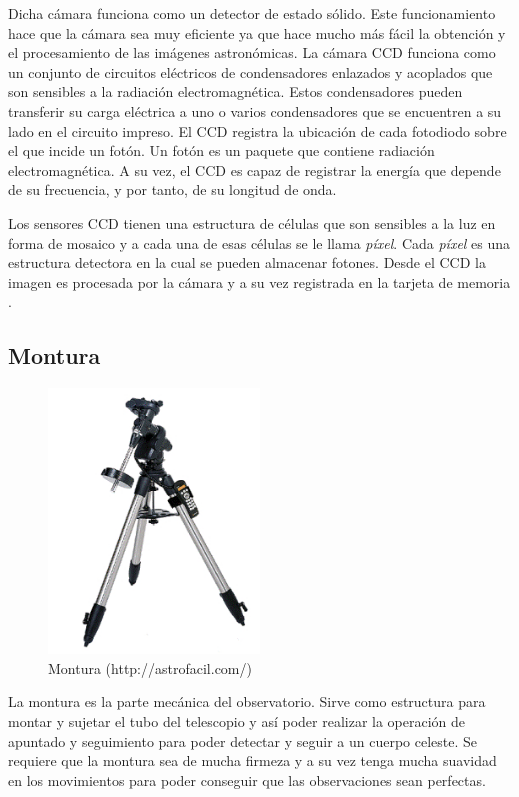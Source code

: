 Dicha cámara funciona como un detector de estado sólido. Este funcionamiento hace que la cámara sea muy eficiente ya que hace mucho más fácil la obtención y el procesamiento de las imágenes astronómicas.
La cámara CCD funciona como un conjunto de circuitos eléctricos  de condensadores enlazados y acoplados que son sensibles a la radiación electromagnética. Estos condensadores pueden transferir su carga eléctrica a uno o varios condensadores que se encuentren a su lado en el circuito impreso. El CCD registra la ubicación de cada fotodiodo sobre el que incide un fotón. Un fotón es un paquete que contiene radiación electromagnética. A su vez, el CCD es capaz de registrar la energía que depende de su frecuencia, y por tanto, de su longitud de onda.

Los sensores CCD tienen una estructura de células que son sensibles a la luz en forma de mosaico y a cada una de esas células se le llama \textit{píxel}. Cada \textit{píxel} es una estructura detectora en la cual se pueden almacenar fotones. Desde el CCD la imagen es procesada por la cámara y a su vez registrada en la tarjeta de memoria \cite{CCD}.


\subsection{Montura}
\begin{figure}[htb]
\centering
\includegraphics[width=0.5\textwidth]{./imagenes/montura}
\caption{Montura (http://astrofacil.com/)} \label{fig:montura}
\end{figure}
La montura es la parte mecánica del observatorio. Sirve como estructura para montar y sujetar el tubo del telescopio y así poder realizar la operación de apuntado y seguimiento para poder detectar y seguir a un cuerpo celeste. Se requiere que la montura sea de mucha firmeza y a su vez tenga mucha suavidad en los movimientos para poder conseguir que las observaciones sean perfectas.

